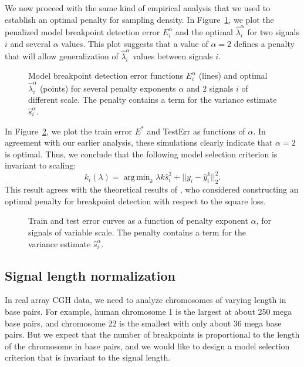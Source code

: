 \documentclass{jsfds} %
\newcommand{\fig}[3][H]{
  \begin{figure}[#1]
    \hskip -1cm
    
    \caption{#3}
    \label{fig:#2}
  \end{figure}
}
\DeclareMathOperator*{\argmin}{arg\,min}
\begin{document}
\newpage

We now proceed with the same kind of empirical analysis that we used
to establish an optimal penalty for sampling density. In
Figure~\ref{fig:variable-scale-berr}, we plot the penalized model
breakpoint detection error $E_i^\alpha$ and the optimal $\hat
\lambda_i^\alpha$ for two signals $i$ and several $\alpha$ values.
This plot suggests that a value of $\alpha=2$ defines a penalty that
will allow generalization of $\hat \lambda^\alpha_i$ values between
signals $i$.

\fig{variable-scale-berr}{Model breakpoint detection error functions
  $E_i^\alpha$ (lines) and optimal $\hat \lambda_i^\alpha$ (points)
  for several penalty exponents $\alpha$ and 2 signals $i$ of
  different scale. The penalty contains a term for the variance
  estimate $\hat s_i^\alpha$.}

\newpage

In Figure~\ref{fig:variable-scale-error-alpha}, we plot the train
error $E^*$ and TestErr as functions of $\alpha$.  In agreement with
our earlier analysis, these simulations clearly indicate that
$\alpha=2$ is optimal. Thus, we conclude that the following model
selection criterion is invariant to scaling:
\begin{equation}
  \label{eq:kstar_shat_opt}
  k_i(\lambda) = \argmin_k \lambda k \hat s_i^2 + ||y_i-\hat y_i^k||^2_2.
\end{equation}
This result agrees with the theoretical results of \citet{lebarbier},
who considered constructing an optimal penalty for breakpoint
detection with respect to the square loss.


\fig{variable-scale-error-alpha}{Train and test error curves as a
  function of penalty exponent $\alpha$, for signals of variable
  scale. The penalty contains a term for the variance estimate $\hat
  s_i^\alpha$.}



\newpage
\subsection{Signal length normalization}
\label{variable_size}
In real array CGH data, we need to analyze chromosomes of varying length
in base pairs. For example, human chromosome 1 is the largest at about
250 mega base pairs, and chromosome 22 is the smallest with only about
36 mega base pairs. But we expect that the number of breakpoints is
proportional to the length of the chromosome in base pairs, and we would
like to design a model selection criterion that is invariant to the
signal length.
\end{document}
